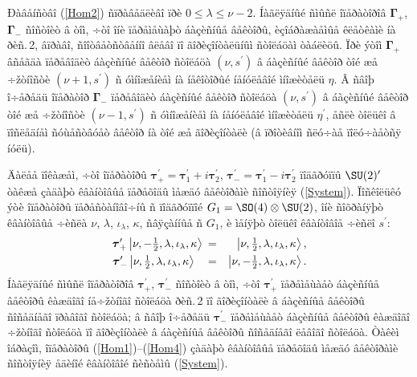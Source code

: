 Ðàâåíñòâî (\ref{Hom2}) ñïðàâåäëèâî ïðè $0\leq\lambda\leq\nu-2$. Íàãëÿäíûé ñìûñë îïåðàòîðîâ $\boldsymbol{\Gamma}_+$, $\boldsymbol{\Gamma}_-$ ñîñòîèò â òîì, ÷òî îíè ïåðåìåùàþò áàçèñíûå âåêòîðû, èçîáðàæàåìûå êëåòêàìè íà ðèñ.\,2, âïðàâî, ñîîòâåòñòâåííî âëåâî ïî ãîðèçîíòàëüíûì ñòîëáöàì òàáëèöû. Ïðè ýòîì $\boldsymbol{\Gamma}_+$ âñåãäà ïåðåâîäèò áàçèñíûé âåêòîð ñòîëáöà $(\nu,s^\prime)$ â áàçèñíûé âåêòîð òîé æå ÷žòíîñòè $(\nu+1,s^\prime)$ ñ óìíîæåíèåì íà íåêîòîðûé íåíóëåâîé ìíîæèòåëü $\eta$. Â ñâîþ î÷åðåäü îïåðàòîð $\boldsymbol{\Gamma}_-$ ïåðåâîäèò áàçèñíûé âåêòîð ñòîëáöà $(\nu,s^\prime)$ â áàçèñíûé âåêòîð òîé æå ÷žòíîñòè $(\nu-1,s^\prime)$ ñ óìíîæåíèåì íà íåíóëåâîé ìíîæèòåëü $\eta^\prime$, åñëè òîëüêî â ïîñëåäíåì ñóùåñòâóåò âåêòîð íà òîé æå ãîðèçîíòàëè (â ïðîòèâíîì ñëó÷àå ïîëó÷àåòñÿ íóëü).

Äàëåå ïîêàæåì, ÷òî îïåðàòîðû $\boldsymbol{\tau}^\prime_+=\boldsymbol{\tau}^\prime_1+i\boldsymbol{\tau}^\prime_2$, $\boldsymbol{\tau}^\prime_-=\boldsymbol{\tau}^\prime_1-i\boldsymbol{\tau}^\prime_2$ ïîäãðóïïû $\SU(2)^\prime$ òàêæå çàäàþò êâàíòîâûå ïåðåõîäû ìåæäó âåêòîðàìè ñîñòîÿíèÿ (\ref{System}). Ïîñêîëüêó ýòè îïåðàòîðû ïåðåñòàíîâî÷íû ñ ïîäãðóïïîé $G_1=\SO(4)\otimes\SU(2)$, îíè ñîõðàíÿþò êâàíòîâûå ÷èñëà $\nu$, $\lambda$, $\iota_\lambda$, $\kappa$, ñâÿçàííûå ñ $G_1$, è ìåíÿþò òîëüêî êâàíòîâîå ÷èñëî $s^\prime$:
\begin{eqnarray}
\boldsymbol{\tau}^\prime_+\left|\nu,-\tfrac{1}{2},\lambda,\iota_\lambda,\kappa\right\rangle\hspace{0.75mm}&=&
\left|\nu,\tfrac{1}{2},\lambda,\iota_\lambda,\kappa\right\rangle,\label{Hom3}\\
\boldsymbol{\tau}^\prime_-\left|\nu,\tfrac{1}{2},\lambda,\iota_\lambda,\kappa\right\rangle\phantom{-}&=&
\left|\nu,-\tfrac{1}{2},\lambda,\iota_\lambda,\kappa\right\rangle.\label{Hom4}
\end{eqnarray}
Íàãëÿäíûé ñìûñë îïåðàòîðîâ $\boldsymbol{\tau}^\prime_+$, $\boldsymbol{\tau}^\prime_-$ ñîñòîèò â òîì, ÷òî $\boldsymbol{\tau}^\prime_+$ ïåðåìåùàåò áàçèñíûå âåêòîðû êàæäîãî íå÷žòíîãî ñòîëáöà ðèñ.\,2 ïî ãîðèçîíòàëè â áàçèñíûå âåêòîðû ñîñåäíåãî ïðàâîãî ñòîëáöà; â ñâîþ î÷åðåäü $\boldsymbol{\tau}^\prime_-$ ïåðåìåùàåò áàçèñíûå âåêòîðû êàæäîãî ÷žòíîãî ñòîëáöà ïî ãîðèçîíòàëè â áàçèñíûå âåêòîðû ñîñåäíåãî ëåâîãî ñòîëáöà. Òàêèì îáðàçîì, îïåðàòîðû (\ref{Hom1})--(\ref{Hom4}) çàäàþò êâàíòîâûå ïåðåõîäû ìåæäó âåêòîðàìè ñîñòîÿíèÿ åäèíîé êâàíòîâîé ñèñòåìû (\ref{System}).

